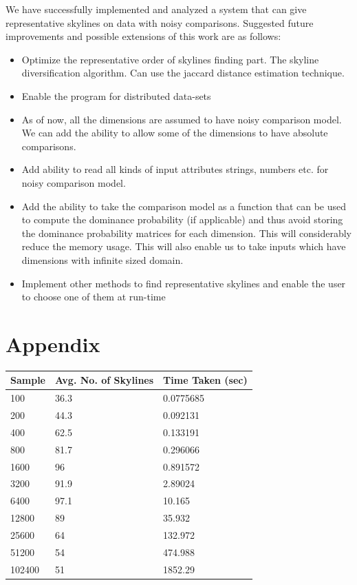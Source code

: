 \documentclass[twocolumn]{article}
\begin{document}
We have successfully implemented and analyzed a system that can give representative skylines on data with noisy comparisons. Suggested future improvements and possible extensions of this work are as follows: 
\begin{itemize}
    \item Optimize the representative order of skylines finding part. The skyline diversification algorithm. Can use the jaccard distance estimation technique.
    \item Enable the program for distributed data-sets
    \item As of now, all the dimensions are assumed to have noisy comparison model. We can add the ability to allow some of the dimensions to have absolute comparisons.
    \item Add ability to read all kinds of input attributes strings, numbers etc. for noisy comparison model.
    \item Add the ability to take the comparison model as a function that can be used to compute the dominance probability (if applicable) and thus avoid storing the dominance probability matrices for each dimension. This will considerably reduce the memory usage. This will also enable us to take inputs which have dimensions with infinite sized domain.
    \item Implement other methods to find representative skylines and enable the user to choose one of them at run-time
    
\end{itemize}

\section{Appendix}
\begin{center}
    \begin{tabular}{ | l | l | l |}
    \hline
    Sample & Avg. No. of Skylines & Time Taken (sec) \\ \hline
    100 & 36.3 & 0.0775685 \\ \hline
    200 & 44.3 & 0.092131 \\ \hline
    400 & 62.5 & 0.133191 \\ \hline
    800 & 81.7 & 0.296066 \\ \hline
    1600 & 96 & 0.891572 \\ \hline
    3200 & 91.9 & 2.89024 \\ \hline
    6400 & 97.1 & 10.165 \\ \hline
    12800 & 89 & 35.932 \\ \hline
    25600 & 64 & 132.972 \\ \hline
    51200 & 54 & 474.988 \\ \hline
    102400 & 51 & 1852.29 \\ \hline
    \end{tabular}
\end{center}
\end{document}
